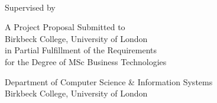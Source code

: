 \begin{center}

\thispagestyle{empty}
\null
\vfill

\LARGE
\textbf{\thetitle}
\large

\vspace{0.5in}

\textbf{\theauthor}\\
Supervised by \supervisor\\
\thedate

\vspace{0.5in}

A Project Proposal Submitted to\\
Birkbeck College, University of London\\
in Partial Fulfillment of the Requirements\\
for the Degree of MSc Business Technologies

\vspace{0.5in}

Department of Computer Science \& Information Systems\\
Birkbeck College, University of London

\vfill

\end{center}
